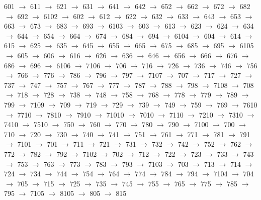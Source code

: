 601 $\rightarrow$ 611 $\rightarrow$ 621 $\rightarrow$ 631 $\rightarrow$ 641 $\rightarrow$ 642 $\rightarrow$ 652 $\rightarrow$ 662 $\rightarrow$ 672 $\rightarrow$ 682 $\rightarrow$ 692 $\rightarrow$ 6102 $\rightarrow$ 602 $\rightarrow$ 612 $\rightarrow$ 622 $\rightarrow$ 632 $\rightarrow$ 633 $\rightarrow$ 643 $\rightarrow$ 653 $\rightarrow$ 663 $\rightarrow$ 673 $\rightarrow$ 683 $\rightarrow$ 693 $\rightarrow$ 6103 $\rightarrow$ 603 $\rightarrow$ 613 $\rightarrow$ 623 $\rightarrow$ 624 $\rightarrow$ 634 $\rightarrow$ 644 $\rightarrow$ 654 $\rightarrow$ 664 $\rightarrow$ 674 $\rightarrow$ 684 $\rightarrow$ 694 $\rightarrow$ 6104 $\rightarrow$ 604 $\rightarrow$ 614 $\rightarrow$ 615 $\rightarrow$ 625 $\rightarrow$ 635 $\rightarrow$ 645 $\rightarrow$ 655 $\rightarrow$ 665 $\rightarrow$ 675 $\rightarrow$ 685 $\rightarrow$ 695 $\rightarrow$ 6105 $\rightarrow$ 605 $\rightarrow$ 606 $\rightarrow$ 616 $\rightarrow$ 626 $\rightarrow$ 636 $\rightarrow$ 646 $\rightarrow$ 656 $\rightarrow$ 666 $\rightarrow$ 676 $\rightarrow$ 686 $\rightarrow$ 696 $\rightarrow$ 6106 $\rightarrow$ 7106 $\rightarrow$ 706 $\rightarrow$ 716 $\rightarrow$ 726 $\rightarrow$ 736 $\rightarrow$ 746 $\rightarrow$ 756 $\rightarrow$ 766 $\rightarrow$ 776 $\rightarrow$ 786 $\rightarrow$ 796 $\rightarrow$ 797 $\rightarrow$ 7107 $\rightarrow$ 707 $\rightarrow$ 717 $\rightarrow$ 727 $\rightarrow$ 737 $\rightarrow$ 747 $\rightarrow$ 757 $\rightarrow$ 767 $\rightarrow$ 777 $\rightarrow$ 787 $\rightarrow$ 788 $\rightarrow$ 798 $\rightarrow$ 7108 $\rightarrow$ 708 $\rightarrow$ 718 $\rightarrow$ 728 $\rightarrow$ 738 $\rightarrow$ 748 $\rightarrow$ 758 $\rightarrow$ 768 $\rightarrow$ 778 $\rightarrow$ 779 $\rightarrow$ 789 $\rightarrow$ 799 $\rightarrow$ 7109 $\rightarrow$ 709 $\rightarrow$ 719 $\rightarrow$ 729 $\rightarrow$ 739 $\rightarrow$ 749 $\rightarrow$ 759 $\rightarrow$ 769 $\rightarrow$ 7610 $\rightarrow$ 7710 $\rightarrow$ 7810 $\rightarrow$ 7910 $\rightarrow$ 71010 $\rightarrow$ 7010 $\rightarrow$ 7110 $\rightarrow$ 7210 $\rightarrow$ 7310 $\rightarrow$ 7410 $\rightarrow$ 7510 $\rightarrow$ 750 $\rightarrow$ 760 $\rightarrow$ 770 $\rightarrow$ 780 $\rightarrow$ 790 $\rightarrow$ 7100 $\rightarrow$ 700 $\rightarrow$ 710 $\rightarrow$ 720 $\rightarrow$ 730 $\rightarrow$ 740 $\rightarrow$ 741 $\rightarrow$ 751 $\rightarrow$ 761 $\rightarrow$ 771 $\rightarrow$ 781 $\rightarrow$ 791 $\rightarrow$ 7101 $\rightarrow$ 701 $\rightarrow$ 711 $\rightarrow$ 721 $\rightarrow$ 731 $\rightarrow$ 732 $\rightarrow$ 742 $\rightarrow$ 752 $\rightarrow$ 762 $\rightarrow$ 772 $\rightarrow$ 782 $\rightarrow$ 792 $\rightarrow$ 7102 $\rightarrow$ 702 $\rightarrow$ 712 $\rightarrow$ 722 $\rightarrow$ 723 $\rightarrow$ 733 $\rightarrow$ 743 $\rightarrow$ 753 $\rightarrow$ 763 $\rightarrow$ 773 $\rightarrow$ 783 $\rightarrow$ 793 $\rightarrow$ 7103 $\rightarrow$ 703 $\rightarrow$ 713 $\rightarrow$ 714 $\rightarrow$ 724 $\rightarrow$ 734 $\rightarrow$ 744 $\rightarrow$ 754 $\rightarrow$ 764 $\rightarrow$ 774 $\rightarrow$ 784 $\rightarrow$ 794 $\rightarrow$ 7104 $\rightarrow$ 704 $\rightarrow$ 705 $\rightarrow$ 715 $\rightarrow$ 725 $\rightarrow$ 735 $\rightarrow$ 745 $\rightarrow$ 755 $\rightarrow$ 765 $\rightarrow$ 775 $\rightarrow$ 785 $\rightarrow$ 795 $\rightarrow$ 7105 $\rightarrow$ 8105 $\rightarrow$ 805 $\rightarrow$ 815 